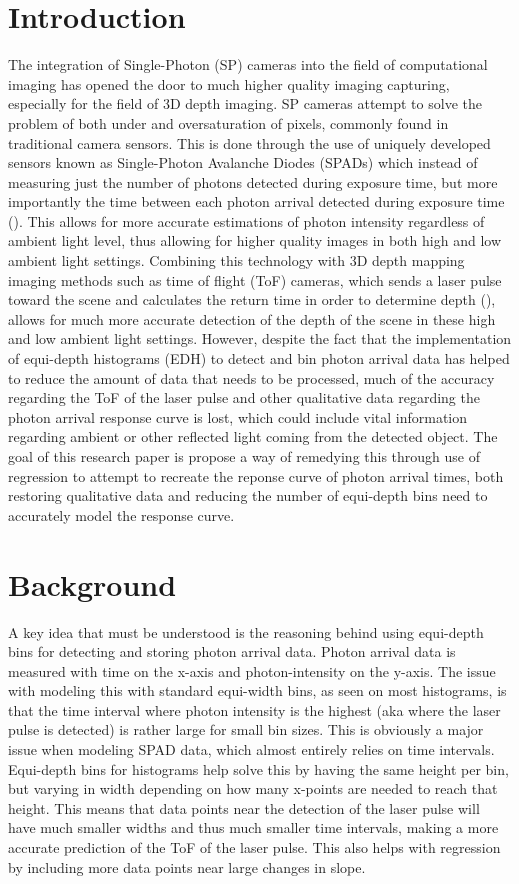\documentclass[letterpaper,12pt]{article}
\begin{document}
\section{Introduction}
The integration of Single-Photon (SP) cameras into the field of computational imaging has opened
the door to much higher quality imaging capturing, especially for the field of 3D depth imaging.
SP cameras attempt to solve the problem of both under and oversaturation of pixels, commonly found
in traditional camera sensors. This is done through the use of uniquely developed sensors known
as Single-Photon Avalanche Diodes (SPADs) which instead of measuring just the number of photons
detected during exposure time, but more importantly the time between each photon arrival 
detected during exposure time (\cite{ingle2019high}). This allows for more accurate estimations
of photon intensity regardless of ambient light level, thus allowing for higher quality images
in both high and low ambient light settings. Combining this technology with 3D depth mapping
imaging methods such as time of flight (ToF) cameras, which sends a laser pulse toward the scene
and calculates the return time in order to determine depth (\cite{Sadekar_2023}), allows for much
more accurate detection of the depth of the scene in these high and low ambient light settings.
However, despite the fact that the implementation of equi-depth histograms (EDH) to detect and
bin photon arrival data has helped to reduce the amount of data that needs to be processed, 
much of the accuracy regarding the ToF of the laser pulse and other qualitative data regarding
the photon arrival response curve is lost, which could include vital information regarding
ambient or other reflected light coming from the detected object. The goal of this research
paper is propose a way of remedying this through use of regression to attempt to recreate
the reponse curve of photon arrival times, both restoring qualitative data and reducing
the number of equi-depth bins need to accurately model the response curve.

\section{Background}
A key idea that must be understood is the reasoning behind using equi-depth bins for
detecting and storing photon arrival data. Photon arrival data is measured with time
on the x-axis and photon-intensity on the y-axis. The issue with modeling this with 
standard equi-width bins, as seen on most histograms, is that the time interval where
photon intensity is the highest (aka where the laser pulse is detected) is rather large
for small bin sizes. This is obviously a major issue when modeling SPAD data, which 
almost entirely relies on time intervals. Equi-depth bins for histograms help solve this
by having the same height per bin, but varying in width depending on how many x-points are
needed to reach that height. This means that data points near the detection of the laser
pulse will have much smaller widths and thus much smaller time intervals, making a more
accurate prediction of the ToF of the laser pulse. This also helps with regression by
including more data points near large changes in slope.
\end{document}
